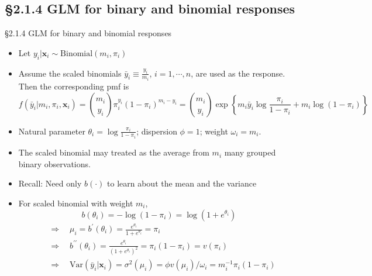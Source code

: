 \documentclass{beamer}
\newcommand{\currentsubsection}{}
\let\oldsubsection\subsection
\renewcommand{\subsection}[1]{\oldsubsection{#1}\renewcommand{\currentsubsection}{#1}}
\newenvironment{wideitemize}%
  {\begin{itemize}%
    \setlength{\parskip}{1em}}%
  {\end{itemize}}
\begin{document}
\subsection{\S2.1.4 GLM for binary and binomial responses}\label{sec:2.1.4}
\begin{frame}{\S2.1.4 GLM for binary and binomial responses }
\begin{wideitemize}
\item
Let $y_i|\textbf{x}_i \sim \mbox{Binomial}(m_i,\pi_i)$

\item  Assume the scaled binomials $\bar{y}_i\equiv\frac{y_i}{m_i}$, $i=1,\cdots,n$,  are used as the
response. Then the corresponding pmf is {\footnotesize
$$f(\bar{y}_i|m_i, \pi_i,\textbf{x}_i)\!=\!{m_i\choose y_i}\pi_i^{y_i}(1-\pi_i)^{m_i\!-\!y_i}\!=\!{m_i\choose y_i}\exp\left\{
m_i\bar{y}_i\log\frac{\pi_i}{1\!-\!\pi_i}+m_i\log (1\!-\!\pi_i)\right\}$$}
\item
Natural parameter $\theta_i=\log\frac{\pi_i}{1-\pi_i}$; dispersion $\phi=1$; weight $\omega_i=m_i$.
\item The scaled binomial may treated as the average from $m_i$ many grouped binary observations. 
\end{wideitemize}
\end{frame}



\begin{frame}
\begin{itemize}
\item
Recall: Need only $b(\cdot)$ to  learn about the mean and the variance
\item For scaled binomial with weight $m_i$, 
 \[
 b(\theta_i)=-\log (1-\pi_i)=\log (1+e^{\theta_i}) 
 \]
\begin{align*}
&\Rightarrow \quad 
\mu_i = b^\prime(\theta_i)=\frac{e^{\theta_i}}{1+e^{\theta_i}}=\pi_i\\
& \Rightarrow\quad b^{\prime\prime}(\theta_i)=\frac{e^{\theta_i}}{(1+e^{\theta_i})^2}=\pi_i(1-\pi_i)
=v(\pi_i)\\
&\Rightarrow\quad \mbox{Var}(\bar{y}_i|\textbf{x}_i)=\sigma^2(\mu_i)=\phi v(\mu_i)/\omega_i
=m_i^{-1}\pi_i(1-\pi_i)
\end{align*}



\end{itemize}
\end{frame}
\end{document}

